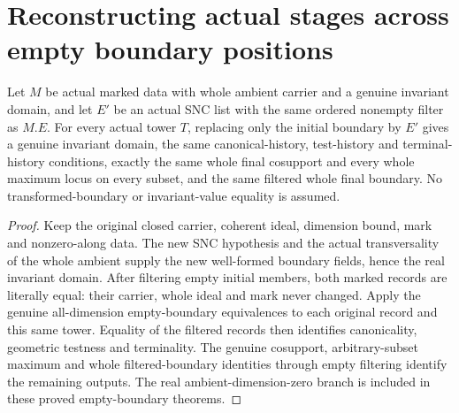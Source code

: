 \section{Reconstructing actual stages across empty boundary positions}

\begin{theorem}
\label{hir:original-same-filtered-boundary-stage-dictionary}
\leanok
Let $M$ be actual marked data with whole ambient carrier and a genuine
invariant domain, and let $E'$ be an actual SNC list with the same
ordered nonempty filter as $M.E$. For every actual tower $T$, replacing
only the initial boundary by $E'$ gives a genuine invariant domain,
the same canonical-history, test-history and terminal-history
conditions, exactly the same whole final cosupport and every whole
maximum locus on every subset, and the same filtered whole final
boundary. No transformed-boundary or invariant-value equality is assumed.
\end{theorem}
\begin{proof}
Keep the original closed carrier, coherent ideal, dimension bound,
mark and nonzero-along data. The new SNC hypothesis and the actual
transversality of the whole ambient supply the new well-formed
boundary fields, hence the real invariant domain. After filtering
empty initial members, both marked records are literally equal:
their carrier, whole ideal and mark never changed. Apply the genuine
all-dimension empty-boundary equivalences to each original record
and this same tower. Equality of the filtered records then identifies
canonicality, geometric testness and terminality. The genuine
cosupport, arbitrary-subset maximum and whole filtered-boundary
identities through empty filtering identify the remaining outputs.
The real ambient-dimension-zero branch is included in these proved
empty-boundary theorems.
\end{proof}

